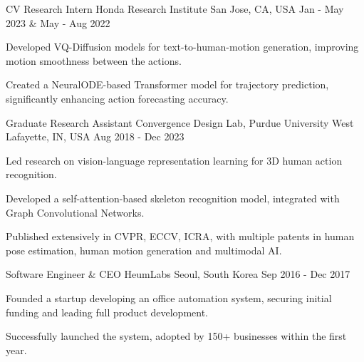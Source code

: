 \begin{cventries}
\cventry
{CV Research Intern} %
{Honda Research Institute} %
{San Jose, CA, USA} %
{Jan - May 2023 \& May - Aug 2022} %
{ %
\begin{cvitems}
    \item Developed VQ-Diffusion models for text-to-human-motion generation, improving motion
        smoothness between the actions.
    \item Created a NeuralODE-based Transformer model for trajectory prediction, significantly enhancing action forecasting accuracy.
\end{cvitems}
}

\cventry
{Graduate Research Assistant} %
{Convergence Design Lab, Purdue University} %
{West Lafayette, IN, USA} %
{Aug 2018 - Dec 2023} %
{ %
\begin{cvitems}
    \item Led research on vision-language representation learning for 3D human action recognition.
    \item Developed a self-attention-based skeleton recognition model, integrated with Graph Convolutional Networks.
    \item Published extensively in CVPR, ECCV, ICRA, with multiple patents in human pose
        estimation, human motion generation and multimodal AI.
\end{cvitems}
}

\cventry
{Software Engineer \& CEO} %
{HeumLabs} %
{Seoul, South Korea} %
{Sep 2016 - Dec 2017} %
{ %
\begin{cvitems}
    \item Founded a startup developing an office automation system, securing initial funding and leading full product development.
    \item Successfully launched the system, adopted by 150+ businesses within the first year.
\end{cvitems}
}
%
%

\end{cventries}
